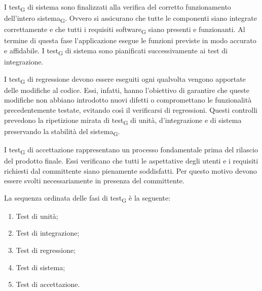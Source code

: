 I {test\textsubscript{G}} di sistema sono finalizzati alla verifica del corretto funzionamento dell'intero {sistema\textsubscript{G}}.
Ovvero si assicurano che tutte le componenti siano integrate correttamente e che tutti i requisiti {software\textsubscript{G}}
siano presenti e funzionanti. Al termine di questa fase l'applicazione esegue le funzioni previste in modo accurato e affidabile.
I {test\textsubscript{G}} di sistema sono pianificati successivamente ai test di integrazione.

I {test\textsubscript{G}} di regressione devono essere eseguiti ogni qualvolta vengono apportate delle modifiche al codice.
Essi, infatti, hanno l'obiettivo di garantire che queste modifiche non abbiano introdotto nuovi difetti o compromettano le funzionalità
precedentemente testate, evitando così il verificarsi di regressioni. Questi controlli prevedono la ripetizione mirata di 
{test\textsubscript{G}} di unità, d'integrazione e di sistema preservando la stabilità del {sistema\textsubscript{G}}.

I {test\textsubscript{G}} di accettazione rappresentano un processo fondamentale prima del rilascio del prodotto finale.
Essi verificano che tutti le aspettative degli utenti e i requisiti richiesti dal committente siano pienamente soddisfatti. Per questo motivo
devono essere svolti necessariamente in presenza del committente.

La sequenza ordinata delle fasi di {test\textsubscript{G}} è la seguente:
\begin{enumerate}
    \item Test di unità;
    \item Test di integrazione;
    \item Test di regressione;
    \item Test di sistema;
    \item Test di accettazione.
\end{enumerate}

